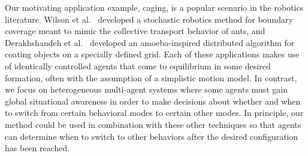 \documentclass[letterpaper, 10 pt, conference]{ieeeconf}  %
\begin{document}
	
	Our motivating application example, caging, is a popular scenario in the
	robotics literature. Wilson et al.~\cite{WPKBPB14} developed a
	stochastic robotics method for boundary coverage meant to mimic the
	collective transport behavior of ants, and Derakhshandeh et
	al.~\cite{DGRSST14} developed an amoeba-inspired distributed algorithm
	for coating objects on a specially defined grid. Each of these
	applications makes use of identically controlled agents that come to
	equilibrium in some desired formation, often with the assumption of a
	simplistic motion model. In contrast, we focus on heterogeneous
	multi-agent systems where some agents must gain global situational
	awareness in order to make decisions about whether and when to switch
	from certain behavioral modes to certain other modes. In principle, our
	method could be used in combination with these other techniques so that
	agents can determine when to switch to other behaviors after the desired
	configuration has been reached.
	
\end{document}
